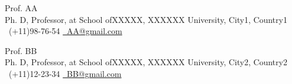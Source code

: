 
\begin{cventries}
  \cventry
    {} %
    {} %
    {} %
    {} %
    {
    	 \vspace{-4.0mm}         
      \begin{cvitems} %
  \item { Prof. AA\\
        Ph. D, Professor,  at School ofXXXXX, XXXXXX University,
City1, Country1\\ 
\faPhone \ (+11)98-76-54 \quad   \href{mailto:AA@gmail.com}{\faEnvelopeO \ AA@gmail.com} 
}
  \item { Prof. BB\\
	Ph. D, Professor,  at School ofXXXXX, XXXXXX University,
	City2, Country2\\ 
	\faPhone \ (+11)12-23-34 \quad   \href{mailto:BB@gmail.com}{\faEnvelopeO \ BB@gmail.com} 
}
      \end{cvitems}
    }

\end{cventries}
